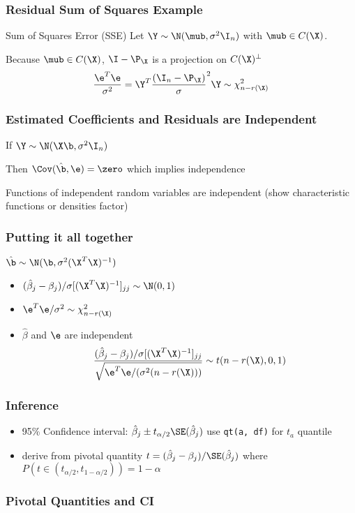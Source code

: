 \documentclass{beamer}
\begin{document}
\begin{frame} \frametitle{Residual Sum of Squares Example}
 
\begin{block}{Sum of Squares Error  (SSE)}
Let $\Y \sim \N(\mub, \sigma^2 \I_n)$ with $\mub \in C(\X)$.


Because $\mub \in C(\X)$, $\I - \P_{\X}$ is a projection on
$C(\X)^{\perp}$ \pause $$\frac{\e^T\e}{\sigma^2} = \Y^T\frac{(\I_n - \P_\X)}\sigma^2 \Y  \sim
 \chi^2_{n - r(\X)}$$ 
\end{block}
\end{frame}

\begin{frame}
\frametitle{ Estimated Coefficients and Residuals are Independent}
If  $\Y \sim \N(\X\b, \sigma^2 \I_n)$

Then $\Cov(\hat{\b}, \e) = \zero$ which implies independence 
\vfill

Functions of independent random variables are independent
(show characteristic functions or densities factor)
\end{frame}

\begin{frame}\frametitle{Putting it all together}
$\hat{\b} \sim \N(\b, \sigma^2 (\X^T\X)^{-1})$
  \begin{itemize}
  \item $(\hat{\beta}_j - \beta_j)/ \sigma [(\X^T\X)^{-1}]_{jj} \sim
    \N(0,1)$
\item $\e^T\e/ \sigma^2 \sim \chi^2_{n - r(\X)}$
\item $\hat{\beta}$ and $\e$ are independent
$$ \frac{(\hat{\beta}_j - \beta_j)/ \sigma [(\X^T\X)^{-1}]_{jj}}
{\sqrt{\e^T\e/ ( \sigma^2 (n - r(\X)))}} \sim t(n - r(\X), 0, 1)$$
  \end{itemize}
\end{frame}

\begin{frame}
  \frametitle{Inference}
\vspace{-.5in}

  \begin{itemize}
  \item 
   95\% Confidence interval:  $\hat{\beta}_j \pm t_{\alpha/2}
   \SE(\hat{\beta}_j)$  \pause use {\tt qt(a, df)} for $t_a$ quantile
\item derive from pivotal quantity $t = (\hat{\beta}_j -
  \beta_j)/\SE(\hat{\beta}_j)$ where 
 $P(t \in (t_{\alpha/2}, t_{1 - \alpha/2}))  = 1 -\alpha$
  \end{itemize}

\vfill

\end{frame}
\begin{frame} \frametitle{Pivotal Quantities and CI}

  
\end{frame}
\end{document}
